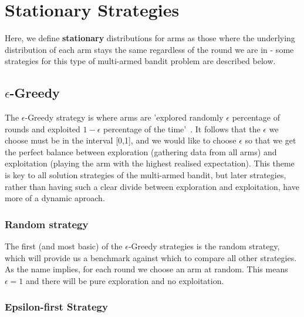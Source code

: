 \section{Stationary Strategies}\label{sec:stationary-strategies}
Here, we define \textbf{stationary} distributions for arms as those where the underlying distribution of each arm stays the same regardless of the round we are in - some strategies for this type of multi-armed bandit problem are described below.

\subsection{$\epsilon$-Greedy}\label{subsec: $epsilon$-greedy}
The $\epsilon$-Greedy strategy is where arms are 'explored randomly $\epsilon$ percentage of rounds and exploited $1-\epsilon$ percentage of the time'~\citep{DBLP:journals/corr/abs-1807-09809}.
It follows that the $\epsilon$ we choose must be in the interval [0,1], and we would like to choose $\epsilon$ so that we get the perfect balance between exploration (gathering data from all arms) and exploitation (playing the arm with the highest realised expectation).
This theme is key to all solution strategies of the multi-armed bandit, but later strategies, rather than having such a clear divide between exploration and exploitation, have more of a dynamic aproach.

\subsubsection{Random strategy}
The first (and most basic) of the $\epsilon$-Greedy strategies is the random strategy, which will provide us a benchmark against which to compare all other strategies.
As the name implies, for each round we choose an arm at random.
This means $\epsilon=1$ and there will be pure exploration and no exploitation.

\subsubsection{Epsilon-first Strategy}

